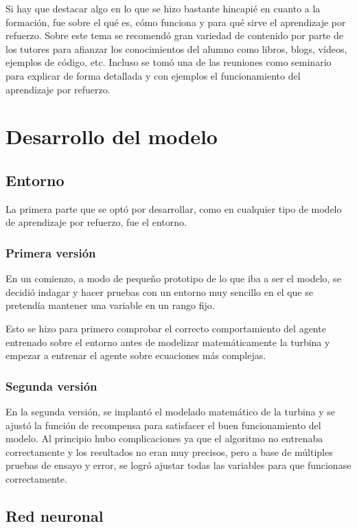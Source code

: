 Si hay que destacar algo en lo que se hizo bastante hincapié en cuanto a la formación, fue sobre el qué es, cómo funciona y para qué sirve el aprendizaje por refuerzo.
Sobre este tema se recomendó gran variedad de contenido por parte de los tutores para afianzar los conocimientos del alumno como libros, blogs, vídeos, ejemplos de código, etc. Incluso se tomó una de las reuniones como seminario para explicar de forma detallada y con ejemplos el funcionamiento del aprendizaje por refuerzo.


\section{Desarrollo del modelo}

\subsection{Entorno}

La primera parte que se optó por desarrollar, como en cualquier tipo de modelo de aprendizaje por refuerzo, fue el entorno.

\subsubsection{Primera versión}

En un comienzo, a modo de pequeño prototipo de lo que iba a ser el modelo, se decidió indagar y hacer pruebas con un entorno muy sencillo en el que se pretendía mantener una variable en un rango fijo.

Esto se hizo para primero comprobar el correcto comportamiento del agente entrenado sobre el entorno antes de modelizar matemáticamente la turbina y empezar a entrenar el agente sobre ecuaciones más complejas.

\subsubsection{Segunda versión}

En la segunda versión, se implantó el modelado matemático de la turbina y se ajustó la función de recompensa para satisfacer el buen funcionamiento del modelo. Al principio hubo complicaciones ya que el algoritmo no entrenaba correctamente y los resultados no eran muy precisos, pero a base de múltiples pruebas de ensayo y error, se logró ajustar todas las variables para que funcionase correctamente.

\subsection{Red neuronal}

